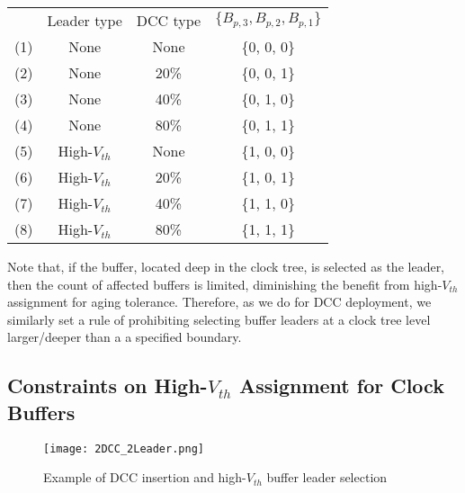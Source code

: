 {\small
\begin{tabular}{  c  c  c  c  }
  	 & Leader type & DCC type & $\{B_{p,3}, B_{p,2}, B_{p,1}\}$ \\ 
  	(1)\quad & None & None & \{0, 0, 0\} \\ 
  	(2)\quad & None &20\% &  \{0, 0, 1\} \\ 
  	(3)\quad & None &40\% &  \{0, 1, 0\} \\ 
  	(4)\quad & None &80\% &  \{0, 1, 1\} \\ 
	(5)\quad & High-$V_{th}$ & None & \{1, 0, 0\} \\ 
  	(6)\quad & High-$V_{th}$ & 20\% &  \{1, 0, 1\} \\ 
  	(7)\quad & High-$V_{th}$ & 40\% &  \{1, 1, 0\} \\ 
  	(8)\quad & High-$V_{th}$ & 80\% &  \{1, 1, 1\} \\ 
\end{tabular}}

Note that, if the buffer, located deep in the clock tree, is selected as the leader, then the count of affected buffers is limited, diminishing the benefit from high-$V_{th}$ assignment for aging tolerance. Therefore, as we do for DCC deployment, we similarly set a rule of prohibiting selecting buffer leaders at a clock tree level larger/deeper than a a specified boundary.
\subsection{Constraints on High-$V_{th}$ Assignment for Clock Buffers}
\begin{comment}
\begin{figure}
	\centering
	\texttt{[image: All\_types\_of\_DCCs\_and\_leaders.png]} %
	\caption{Generalized DCC insertion and high-$V_{th}$ buffer leader selection, for a target pair of flip-flops}
	\label{fig:leadertype}
\end{figure}
\end{comment}
\begin{figure}[t!]
    \centering
    \texttt{[image: 2DCC\_2Leader.png]} %
    \caption{Example of DCC insertion and high-$V_{th}$ buffer leader selection}
    \label{fig:2dcc2leader}
\end{figure}


